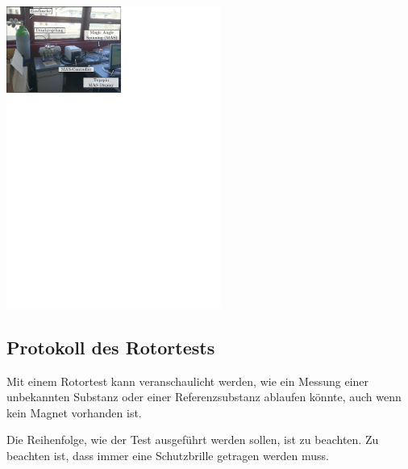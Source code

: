\documentclass[a4paper]{article}
\newenvironment{Figure}
	{\par\medskip\noindent\minipage{\linewidth}}
	{\endminipage\par\medskip}
\begin{document}
\begin{multicols*}{2}
			\begin{Figure}
				\centering
				\includegraphics[trim={0cm 21.2cm 9.7cm 0},clip,width=7cm]{images/Device_2.pdf}
				\label{fig:device2}
			\end{Figure}
		
			\subsection{Protokoll des Rotortests}
				Mit einem Rotortest kann veranschaulicht werden, wie ein Messung einer unbekannten Substanz oder einer
				Referenzsubstanz ablaufen könnte, auch wenn kein Magnet vorhanden ist.
				
				Die Reihenfolge, wie der Test ausgeführt werden sollen, ist zu beachten. Zu beachten ist, dass
				immer eine Schutzbrille getragen werden muss.
				

\end{multicols*}
\end{document}
